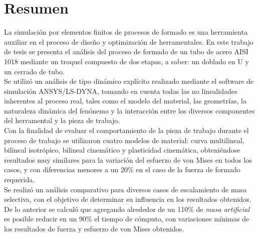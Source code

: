 \chapter*{Resumen}


La simulación por elementos finitos de procesos de formado es una herramienta auxiliar en el proceso de 
diseño y optimización de herramentales. En este trabajo de tesis se presenta el análisis del proceso de formado 
de un tubo de acero AISI 1018 mediante un troquel compuesto de dos etapas, a saber: un doblado en U y un 
cerrado de tubo.\\

Se utilizó un análisis de tipo dinámico explícito realizado mediante el software de simulación 
ANSYS/LS-DYNA\CR, tomando en cuenta todas las no linealidades inherentes al proceso real, tales 
como el modelo del material, las geometrías, la naturaleza dinámica del fenónemo y la interacción 
entre los diversos componentes del herramental y la pieza de trabajo.\\

Con la finalidad de evaluar el comportamiento de la pieza de trabajo durante el proceso de trabajo 
se utilizaron cuatro modelos de material: curva multilineal, bilineal isotrópico, bilineal cinemático 
y plasticidad cinemática, obteniéndose resultados muy similares para la variación del esfuerzo de 
von Mises en todos los casos, y con diferencias menores a un 20\% en el caso de la fuerza de formado requerida. \\

Se realizó un análisis comparativo para diversos casos de escalamiento de masa selectiva, con el objetivo 
de determinar su influencia en los resultados obtenidos. De lo anterior se calculó que agregando alrededor de 
un 110\% de \textit{masa artificial} es posible reducir en un 90\% el tiempo de cómputo, con variaciones mínimas 
de los resultados de fuerza y esfuerzo de von Mises obtenidos.\\
